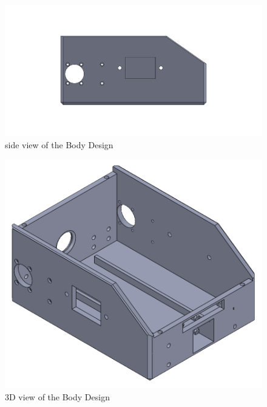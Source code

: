 \begin{figure}[h]
	\centering
	\includegraphics[width=1\linewidth]{Body_Design_2}
	\caption[Side view of the Body Design]{side view of the Body Design}
	\label{fig:bodydesign2}
\end{figure}
\vspace{10cm}
\begin{figure}[h]
	\centering
	\includegraphics[width=0.8\linewidth]{Body_Design_3}
	\caption[3D view of the Body Design]{3D view of the Body Design}
	\label{fig:bodydesign3}
\end{figure}

\newpage
